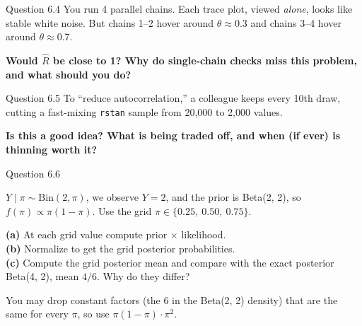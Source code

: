 \documentclass[aspectratio=43,11pt]{beamer}
\begin{document}
\begin{frame}{Question 6.4}
  You run 4 parallel chains. Each trace plot, viewed \emph{alone}, looks
  like stable white noise. But chains 1--2 hover around $\theta \approx 0.3$
  and chains 3--4 hover around $\theta \approx 0.7$.
  \vspace{0.6em}

  \textbf{Would $\hat R$ be close to 1? Why do single-chain checks miss this
  problem, and what should you do?}
\end{frame}

\begin{frame}{Question 6.5}
  To ``reduce autocorrelation,'' a colleague keeps every 10th draw,
  cutting a fast-mixing \texttt{rstan} sample from 20{,}000 to 2{,}000 values.
  \vspace{0.6em}

  \textbf{Is this a good idea? What is being traded off, and when (if ever)
  is thinning worth it?}
\end{frame}

\begin{frame}{Question 6.6}
%

  $Y \mid \pi \sim \text{Bin}(2, \pi)$, we observe $Y = 2$, and the prior is
  Beta(2, 2), so $f(\pi) \propto \pi(1-\pi)$.
  Use the grid $\pi \in \{0.25,\ 0.50,\ 0.75\}$.
  \vspace{0.6em}
 
  \textbf{(a)} At each grid value compute prior $\times$ likelihood.\\[0.3em]
  \textbf{(b)} Normalize to get the grid posterior probabilities. \\[0.3em]
  \textbf{(c)} Compute the grid posterior mean and compare with the exact
  posterior Beta(4, 2), mean $4/6$. Why do they differ?
  
  \vspace{.5cm}  
  \footnotesize You may drop constant factors (the 6 in the Beta(2, 2) density) that are the same for every $\pi$, so use $\pi(1-\pi) \cdot \pi^2$. %
\end{frame}
\end{document}
